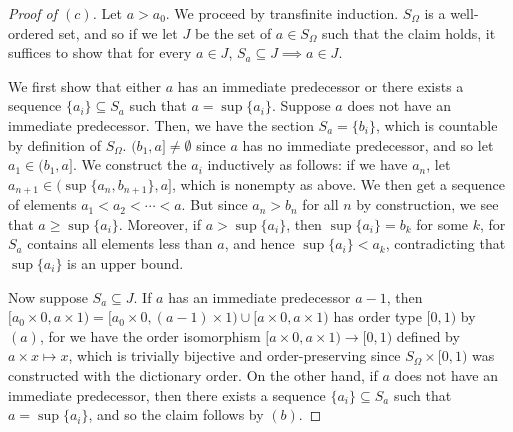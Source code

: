 \documentclass[12pt]{article}
\theoremstyle{remark}
\begin{document}
\begin{proof}[Proof of $(c)$]
  Let $a > a_0$. We proceed by transfinite induction. $S_\Omega$ is a well-ordered set, and so if we let $J$ be the set of $a \in S_\Omega$ such that the claim holds, it suffices to show that for every $a \in J$, $S_a \subseteq J \implies a \in J$.
  \par We first show that either $a$ has an immediate predecessor or there exists a sequence $\{a_i\} \subseteq S_a$ such that $a = \sup \{a_i\}$. Suppose $a$ does not have an immediate predecessor. Then, we have the section $S_a = \{b_i\}$, which is countable by definition of $S_\Omega$. $(b_1,a] \ne \emptyset$ since $a$ has no immediate predecessor, and so let $a_1 \in (b_1,a]$. We construct the $a_i$ inductively as follows: if we have $a_n$, let $a_{n+1} \in (\sup\{a_n,b_{n+1}\},a]$, which is nonempty as above. We then get a sequence of elements $a_1 < a_2 < \cdots < a$. But since $a_n > b_n$ for all $n$ by construction, we see that $a \ge \sup \{a_i\}$. Moreover, if $a > \sup \{a_i\}$, then $\sup \{a_i\} = b_k$ for some $k$, for $S_a$ contains all elements less than $a$, and hence $\sup \{a_i\} < a_k$, contradicting that $\sup\{a_i\}$ is an upper bound.
  \par Now suppose $S_a \subseteq J$. If $a$ has an immediate predecessor $a-1$, then $[a_0 \times 0,a \times 1) = [a_0 \times 0,(a-1) \times 1) \cup [a \times 0,a \times 1)$ has order type $[0,1)$ by $(a)$, for we have the order isomorphism $[a \times 0,a \times 1) \to [0,1)$ defined by $a \times x \mapsto x$, which is trivially bijective and order-preserving since $S_\Omega \times [0,1)$ was constructed with the dictionary order. On the other hand, if $a$ does not have an immediate predecessor, then there exists a sequence $\{a_i\} \subseteq S_a$ such that $a = \sup \{a_i\}$, and so the claim follows by $(b)$.
\end{proof}
\end{document}
